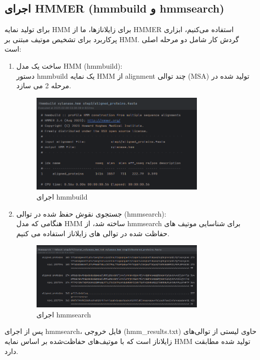             \subsection*{اجرای HMMER (hmmbuild و hmmsearch)}
                برای تولید نمایه HMM برای زایلانازها، ما از HMMER استفاده می‌کنیم، ابزاری پرکاربرد برای تشخیص موتیف مبتنی بر HMM. گردش کار شامل دو مرحله اصلی است:
                \begin{enumerate}
                    \item ساخت یک مدل HMM (hmmbuild):\\
                    دستور hmmbuild یک نمایه HMM از alignment چند توالی (MSA) تولید شده در مرحله 2 می سازد.
                    \begin{figure}[H]
                        \centering
                        \includegraphics[width=0.8\textwidth]{images/hmmbuild.png} %
                        \caption{اجرای hmmbuild}
                        \label{fig:hmmbuild}
                    \end{figure}
                    \item جستجوی نقوش حفظ شده در توالی (hmmsearch):\\
                    هنگامی که مدل HMM ساخته شد، از hmmsearch برای شناسایی موتیف های حفاظت شده در توالی های زایلاناز استفاده می کنیم.
                    \begin{figure}[H]
                        \centering
                        \includegraphics[width=0.8\textwidth]{images/hmmsearch.png} %
                        \caption{اجرای hmmsearch}
                        \label{fig:hmmsearch}
                    \end{figure}
                \end{enumerate}
                پس از اجرای hmmsearch، فایل خروجی (hmm\_results.txt) حاوی لیستی از توالی‌های زایلاناز است که با موتیف‌های حفاظت‌شده بر اساس نمایه HMM تولید شده مطابقت دارد.

